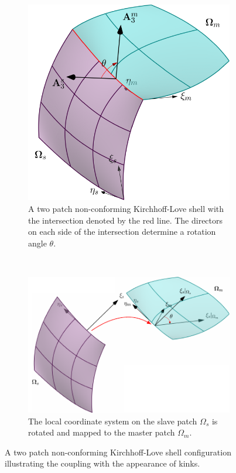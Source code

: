 \documentclass[preprint,12pt]{elsarticle}
\theoremstyle{remark}
\begin{document}
\begin{figure}[hbt]
    \centering
    \captionsetup[subfigure]{font = footnotesize}
    \begin{subfigure}[b]{\textwidth}
        \centering
        \includegraphics[width=.6\textwidth]{two-patch-kl}
        \caption{A two patch non-conforming Kirchhoff-Love shell with the intersection denoted by the red line. The directors on each side of the intersection determine a rotation angle $\theta$.}
    \end{subfigure}\\
    \begin{subfigure}[b]{\textwidth}
        \centering
        \includegraphics[width=.9\textwidth]{combine}
        \caption{The local coordinate system on the slave patch $\Omega_{s}$ is rotated and mapped to the master patch $\Omega_{m}$.}
    \end{subfigure}
	\caption{A two patch non-conforming Kirchhoff-Love shell configuration illustrating the coupling with the appearance of kinks.}\label{fig:KL-shell-geometry}
\end{figure}
\end{document}
